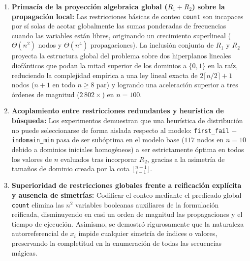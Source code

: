 \begin{enumerate}
    \item \textbf{Primacía de la proyección algebraica global ($R_1 + R_2$) sobre la propagación local:} Las restricciones básicas de conteo \texttt{count} son incapaces por sí solas de acotar globalmente las sumas ponderadas de frecuencias cuando las variables están libres, originando un crecimiento superlineal ($\Theta(n^2)$ nodos y $\Theta(n^4)$ propagaciones). La inclusión conjunta de $R_1$ y $R_2$ proyecta la estructura global del problema sobre dos hiperplanos lineales diofánticos que podan la mitad superior de los dominios a $\{0, 1\}$ en la raíz, reduciendo la complejidad empírica a una ley lineal exacta de $2\lceil n/2 \rceil + 1$ nodos ($n + 1$ en todo $n \ge 8$ par) y logrando una aceleración superior a tres órdenes de magnitud ($2\,802\times$) en $n=100$.
    \item \textbf{Acoplamiento entre restricciones redundantes y heurística de búsqueda:} Los experimentos demuestran que una heurística de distribución no puede seleccionarse de forma aislada respecto al modelo: \texttt{first\_fail} + \texttt{indomain\_min} pasa de ser subóptima en el modelo base ($117$ nodos en $n=10$ debido a dominios iniciales homogéneos) a ser estrictamente óptima en todos los valores de $n$ evaluados tras incorporar $R_2$, gracias a la asimetría de tamaños de dominio creada por la cota $\lfloor \frac{n-1}{i-1} \rfloor$.
    \item \textbf{Superioridad de restricciones globales frente a reificación explícita y ausencia de simetrías:} Codificar el conteo mediante el predicado global \texttt{count} elimina las $n^2$ variables booleanas auxiliares de la formulación reificada, disminuyendo en casi un orden de magnitud las propagaciones y el tiempo de ejecución. Asimismo, se demostró rigurosamente que la naturaleza autorreferencial de $x_i$ impide cualquier simetría de índices o valores, preservando la completitud en la enumeración de todas las secuencias mágicas.
\end{enumerate}
